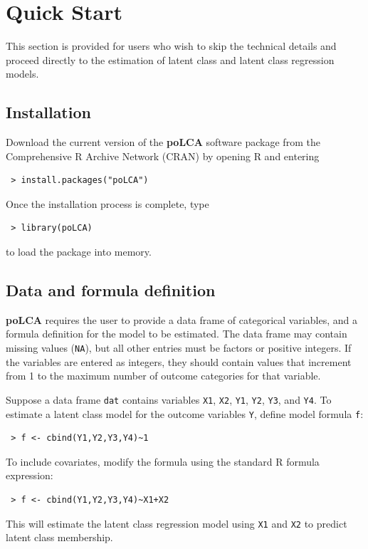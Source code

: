 \documentclass[letterpaper,12pt]{article}
\begin{document}
\newpage

\section{Quick Start}

This section is provided for users who wish to skip the technical details and proceed directly to the estimation of latent class and latent class regression models.

\subsection{Installation}

Download the current version of the \textbf{poLCA} software package from the Comprehensive R Archive Network (CRAN) by opening \textsf{R} and entering
\begin{verbatim}
 > install.packages("poLCA")
\end{verbatim}
Once the installation process is complete, type
\begin{verbatim}
 > library(poLCA)
\end{verbatim}
to load the package into memory.

\subsection{Data and formula definition}

\textbf{poLCA} requires the user to provide a data frame of categorical variables, and a formula definition for the model to be estimated. The data frame may contain missing values (\texttt{NA}), but all other entries must be factors or positive integers.  If the variables are entered as integers, they should contain values that increment from 1 to the maximum number of outcome categories for that variable.

Suppose a data frame \texttt{dat} contains variables \texttt{X1}, \texttt{X2}, \texttt{Y1}, \texttt{Y2}, \texttt{Y3}, and \texttt{Y4}. To estimate a latent class model for the outcome variables \texttt{Y}, define model formula \texttt{f}:
\begin{verbatim}
 > f <- cbind(Y1,Y2,Y3,Y4)~1
\end{verbatim}
To include covariates, modify the formula using the standard \textsf{R} formula expression:
\begin{verbatim}
 > f <- cbind(Y1,Y2,Y3,Y4)~X1+X2
\end{verbatim}
This will estimate the latent class regression model using \texttt{X1} and \texttt{X2} to predict latent class membership.
\end{document}
